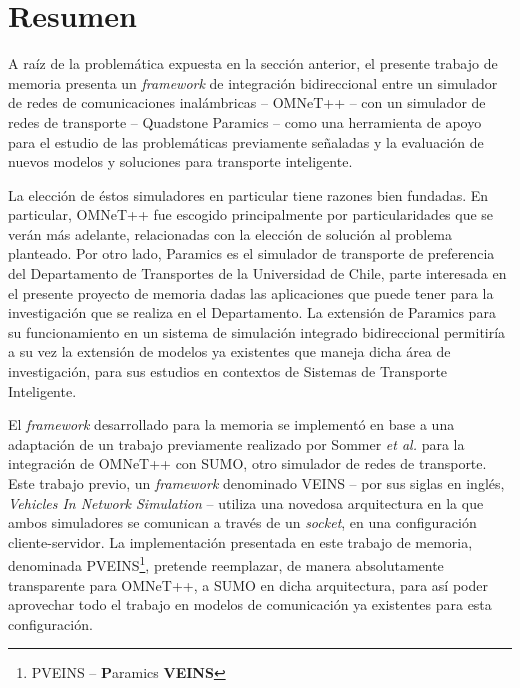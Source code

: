 \section{Resumen}

A raíz de la problemática expuesta en la sección anterior, el presente trabajo de memoria presenta un \emph{framework} de integración bidireccional entre un simulador de redes de comunicaciones inalámbricas -- OMNeT++ -- con un simulador de redes de transporte -- Quadstone Paramics -- como una herramienta de apoyo para el estudio de las problemáticas previamente señaladas y la evaluación de nuevos modelos y soluciones para transporte inteligente.

La elección de éstos simuladores en particular tiene razones bien fundadas. En particular, OMNeT++ fue escogido principalmente por particularidades que se verán más adelante, relacionadas con la elección de solución al problema planteado. Por otro lado, Paramics es el simulador de transporte de preferencia del Departamento de Transportes de la Universidad de Chile, parte interesada en el presente proyecto de memoria dadas las aplicaciones que puede tener para la investigación que se realiza en el Departamento. La extensión de Paramics para su funcionamiento en un sistema de simulación integrado bidireccional permitiría a su vez la extensión de modelos ya existentes que maneja dicha área de investigación, para sus estudios en contextos de Sistemas de Transporte Inteligente.

El \emph{framework} desarrollado para la memoria se implementó en base a una adaptación de un trabajo previamente realizado por Sommer \emph{et al.} \autocite{sommer_german_dressler, sommer_dressler2} para la integración de OMNeT++ con SUMO, otro simulador de redes de transporte. Este trabajo previo, un \emph{framework} denominado VEINS -- por sus siglas en inglés, \emph{Vehicles In Network Simulation} -- utiliza una novedosa arquitectura en la que ambos simuladores se comunican a través de un \emph{socket}, en una configuración cliente-servidor. La implementación presentada en este trabajo de memoria, denominada PVEINS\footnote{PVEINS -- \textbf{P}aramics \textbf{VEINS}}, pretende reemplazar, de manera absolutamente transparente para OMNeT++, a SUMO en dicha arquitectura, para así poder aprovechar todo el trabajo en modelos de comunicación ya existentes para esta configuración.

